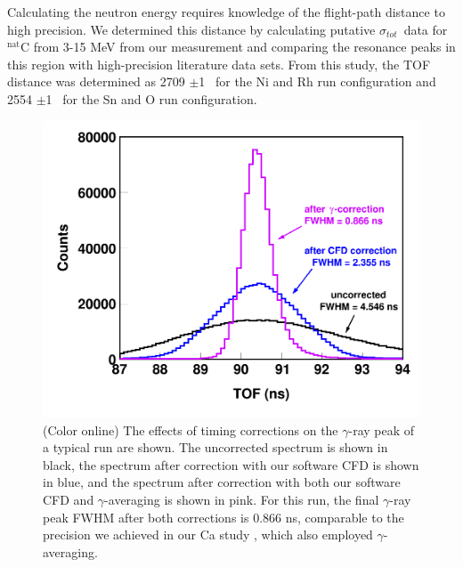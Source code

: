 \documentclass[twocolumn,secnumarabic,amssymb, nobibnotes, aps, prl,
superscriptaddress, nobalancelastpage, draft]{revtex4}
\newcommand{\tot}{\ensuremath{\sigma_{tot}}}
\begin{document}
Calculating the neutron energy requires knowledge of the flight-path
distance to high precision. We determined this distance by calculating 
putative \tot\ data for $^{\text{nat}}$C from 3-15 MeV from our measurement and 
comparing the resonance peaks in this region with high-precision literature data
sets. From this study, the TOF distance was determined as 2709 $\pm$1
\centi\meter\ for the Ni and Rh run configuration and 2554
$\pm$1 \centi\meter\ for the Sn and O run configuration.
\begin{figure}
    \includegraphics[width=\linewidth]{figures/TimeCorrections.png}
    \caption{(Color online) The effects of timing corrections on the $\gamma$-ray
        peak of a typical run are shown. The uncorrected spectrum is shown in black,
        the spectrum after correction with our software CFD is shown in blue,
        and the spectrum after correction with both our software CFD and
        $\gamma$-averaging is 
        shown in pink. For this run, the final $\gamma$-ray peak 
        FWHM after both corrections is 0.866 ns, comparable to the precision we
        achieved in our Ca study \cite{Shane2010}, which also employed $\gamma$-
        averaging.}
    \label{TimingCorrectionStudy}
\end{figure}
\end{document}
